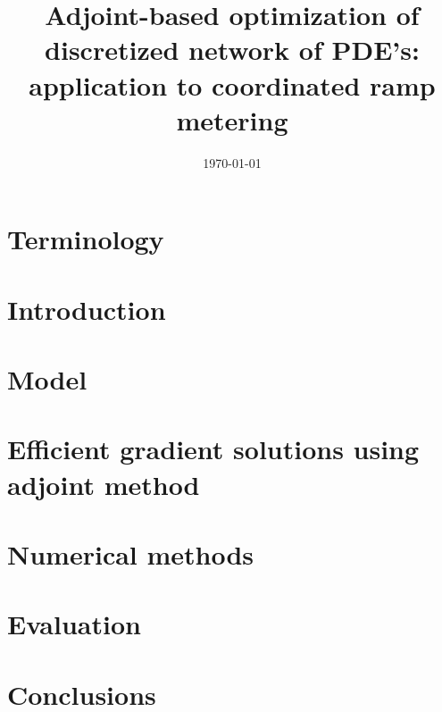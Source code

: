 \documentclass{article}
\begin{document}
\title{Adjoint-based optimization of discretized network of PDE's: application to coordinated ramp metering}


\date{\today}

\maketitle

\begin{abstract}

\end{abstract}



\section*{Terminology}



\section{Introduction}\label{sec:introduction}


\section{Model} %
\label{sec:model}



\section{Efficient gradient solutions using adjoint method} %
\label{sec:efficient_gradient_solutions}



\section{Numerical methods} %
\label{sec:numerical_methods}



\section{Evaluation}\label{sec:evaluation}


\section{Conclusions}\label{sec:conclusions}






\end{document}
